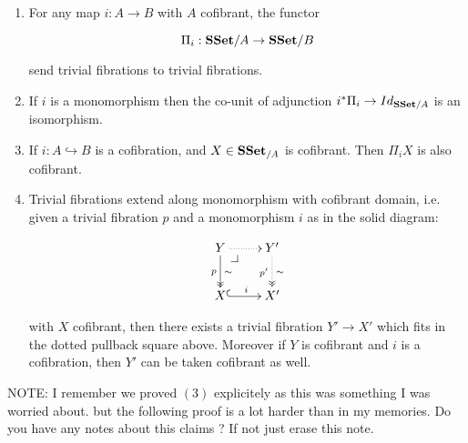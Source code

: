 \documentclass[reqno,10pt,a4paper,oneside,draft]{amsart}
\begin{document}
\begin{lemma}\label{Lemma:ForTheExtProperty}

\begin{enumerate}

\item For any map $i:A \rightarrow B$ with $A$ cofibrant, the functor

 \[ \Pi_i : \mathbf{SSet} /A \rightarrow \mathbf{SSet}/B  \]

send trivial fibrations to trivial fibrations.

\item If $i$ is a monomorphism then the co-unit of adjunction $i^* \Pi_i \rightarrow Id_{\mathbf{SSet}/A}$ is an isomorphism.

\item If $i:A \hookrightarrow B$ is a cofibration, and $X \in \mathbf{SSet}_{/A}$ is cofibrant. Then $\Pi_i X$ is also cofibrant.

\item Trivial fibrations extend along monomorphism with cofibrant domain, i.e. given a trivial fibration $p$ and a monomorphism $i$ as in the solid diagram:

\[
\xymatrix{
Y \ar@{.>}[r] \ar@{->>}[d]^{\sim}_{p} \drpullback  & Y' \ar@{.>>}[d]^{\sim}_{p'} \\
X \ar@{^{(}->}[r]^i &  X' }
\]

with $X$ cofibrant, then there exists a trivial fibration $Y' \rightarrow X'$ which fits in the dotted pullback square above. Moreover if $Y$ is cofibrant and $i$ is a cofibration, then $Y'$ can be taken cofibrant as well.



\end{enumerate}

\end{lemma}

 
NOTE: I remember we proved $(3)$ explicitely as this was something I was worried about. but the following proof is a lot harder than in my memories. Do you have any notes about this claims ? If not just erase this note.
\end{document}
